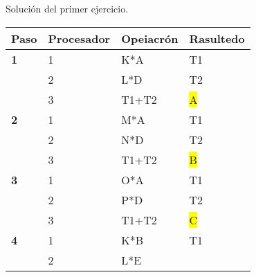 Solución del primer ejercicio.

{\raggedright

\vspace{3pt} \noindent
\begin{tabular}{|p{96pt}p{96pt}p{96pt}p{96pt}|}
\hline
\parbox{96pt}{\raggedright 
\textbf{Paso}
} & \parbox{96pt}{\raggedright 
\textbf{Procesador}
} & \parbox{96pt}{\raggedright 
\textbf{Opeiacr\'{o}n}
} & \parbox{96pt}{\raggedright 
\textbf{Rasultedo}
} \\
\hline
\parbox{96pt}{\raggedright 
\textbf{1}
} & \parbox{96pt}{\raggedright 
1
} & \parbox{96pt}{\raggedright 
K*A
} & \parbox{96pt}{\raggedright 
T1
} \\
\hline
\parbox{96pt}{\raggedright } & \parbox{96pt}{\raggedright 
2
} & \parbox{96pt}{\raggedright 
L*D
} & \parbox{96pt}{\raggedright 
T2
} \\
\hline
\parbox{96pt}{\raggedright } & \parbox{96pt}{\raggedright 
3
} & \parbox{96pt}{\raggedright 
T1+T2
} & \parbox{96pt}{\raggedright 
\colorbox[HTML]{FFFF00}{A}
} \\
\hline
\parbox{96pt}{\raggedright 
\textbf{2}
} & \parbox{96pt}{\raggedright 
1
} & \parbox{96pt}{\raggedright 
M*A
} & \parbox{96pt}{\raggedright 
T1
} \\
\hline
\parbox{96pt}{\raggedright } & \parbox{96pt}{\raggedright 
2
} & \parbox{96pt}{\raggedright 
N*D
} & \parbox{96pt}{\raggedright 
T2
} \\
\hline
\parbox{96pt}{\raggedright } & \parbox{96pt}{\raggedright 
3
} & \parbox{96pt}{\raggedright 
T1+T2
} & \parbox{96pt}{\raggedright 
\colorbox[HTML]{FFFF00}{B}
} \\
\hline
\parbox{96pt}{\raggedright 
\textbf{3}
} & \parbox{96pt}{\raggedright 
1
} & \parbox{96pt}{\raggedright 
O*A
} & \parbox{96pt}{\raggedright 
T1
} \\
\hline
\parbox{96pt}{\raggedright } & \parbox{96pt}{\raggedright 
2
} & \parbox{96pt}{\raggedright 
P*D
} & \parbox{96pt}{\raggedright 
T2
} \\
\hline
\parbox{96pt}{\raggedright } & \parbox{96pt}{\raggedright 
3
} & \parbox{96pt}{\raggedright 
T1+T2
} & \parbox{96pt}{\raggedright 
\colorbox[HTML]{FFFF00}{C}
} \\
\hline
\parbox{96pt}{\raggedright 
\textbf{4}
} & \parbox{96pt}{\raggedright 
1
} & \parbox{96pt}{\raggedright 
K*B
} & \parbox{96pt}{\raggedright 
T1
} \\
\hline
\parbox{96pt}{\raggedright } & \parbox{96pt}{\raggedright 
2
} & \parbox{96pt}{\raggedright 
L*E
}
\end{tabular}}
